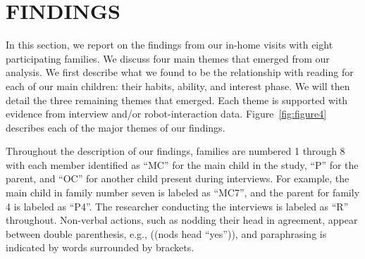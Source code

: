 \documentclass{sigchi}
\begin{document}
 
\section{FINDINGS}
In this section, we report on the findings from our in-home visits with eight participating families. We discuss four main themes that emerged from our analysis. We first describe what we found to be the relationship with reading for each of our main children: their habits, ability, and interest phase. We will then detail the three remaining themes that emerged. Each theme is supported with evidence from interview and/or robot-interaction data. Figure~\ref{fig:figure4} describes each of the major themes of our findings. 

Throughout the description of our findings, families are numbered 1 through 8 with each member identified as ``MC'' for the main child in the study, ``P'' for the parent, and ``OC'' for another child present during interviews. For example, the main child in family number seven is labeled as ``MC7'', and the parent for family 4 is labeled as ``P4''. The researcher conducting the interviews is labeled as ``R'' throughout. Non-verbal actions, such as nodding their head in agreement, appear between double parenthesis, e.g., ((nods head ``yes'')), and paraphrasing is indicated by words surrounded by brackets.
\end{document}
